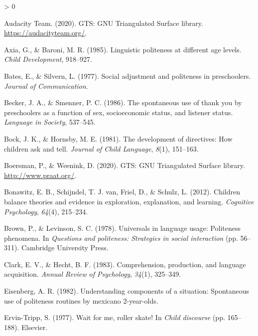 \documentclass[
  english,
  man,floatsintext]{apa6}
\newlength{\cslhangindent}
\newenvironment{CSLReferences}[2] %
 {%
  \setlength{\parindent}{0pt}
  \ifodd #1 \everypar{\setlength{\hangindent}{\cslhangindent}}\ignorespaces\fi
  \ifnum #2 > 0
  \setlength{\parskip}{#2\baselineskip}
  \fi
 }%
 {}
\begin{document}
\hypertarget{refs}{}
\begin{CSLReferences}{1}{0}
\leavevmode\hypertarget{ref-audacity2020}{}%
Audacity Team. (2020). {GTS}: {GNU} {Triangulated} {Surface} library. \url{https://audacityteam.org/}.

\leavevmode\hypertarget{ref-axia1985}{}%
Axia, G., \& Baroni, M. R. (1985). Linguistic politeness at different age levels. \emph{Child Development}, 918--927.

\leavevmode\hypertarget{ref-bates1977}{}%
Bates, E., \& Silvern, L. (1977). Social adjustment and politeness in preschoolers. \emph{Journal of Communication}.

\leavevmode\hypertarget{ref-becker1986}{}%
Becker, J. A., \& Smenner, P. C. (1986). The spontaneous use of thank you by preschoolers as a function of sex, socioeconomic status, and listener status. \emph{Language in Society}, 537--545.

\leavevmode\hypertarget{ref-bock1981}{}%
Bock, J. K., \& Hornsby, M. E. (1981). The development of directives: How children ask and tell. \emph{Journal of Child Language}, \emph{8}(1), 151--163.

\leavevmode\hypertarget{ref-boersman2020}{}%
Boersman, P., \& Weenink, D. (2020). {GTS}: {GNU} {Triangulated} {Surface} library. \url{http://www.praat.org/}.

\leavevmode\hypertarget{ref-bonawitz2012}{}%
Bonawitz, E. B., Schijndel, T. J. van, Friel, D., \& Schulz, L. (2012). Children balance theories and evidence in exploration, explanation, and learning. \emph{Cognitive Psychology}, \emph{64}(4), 215--234.

\leavevmode\hypertarget{ref-brown1978}{}%
Brown, P., \& Levinson, S. C. (1978). Universals in language usage: Politeness phenomena. In \emph{Questions and politeness: Strategies in social interaction} (pp. 56--311). Cambridge University Press.

\leavevmode\hypertarget{ref-clark1983}{}%
Clark, E. V., \& Hecht, B. F. (1983). Comprehension, production, and language acquisition. \emph{Annual Review of Psychology}, \emph{34}(1), 325--349.

\leavevmode\hypertarget{ref-eisenberg1982}{}%
Eisenberg, A. R. (1982). Understanding components of a situation: Spontaneous use of politeness routines by mexicano 2-year-olds.

\leavevmode\hypertarget{ref-ervintripp1977}{}%
Ervin-Tripp, S. (1977). Wait for me, roller skate! In \emph{Child discourse} (pp. 165--188). Elsevier.


\end{CSLReferences}
\end{document}
